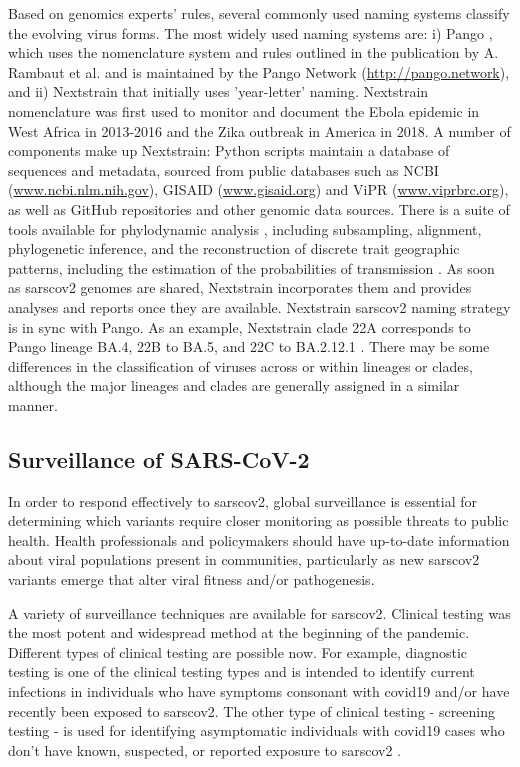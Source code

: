        Based on genomics experts' rules, several commonly used naming systems \cite{reich} classify the evolving virus forms. The most widely used naming systems are: i) Pango \cite{otoole2021}, which uses the nomenclature system and rules outlined in the publication by A. Rambaut et al. \cite{rambaut2020} and is maintained by the Pango Network (\url{http://pango.network}), and ii) Nextstrain that initially uses 'year-letter' naming. Nextstrain nomenclature was first used to monitor and document the Ebola epidemic in West Africa in 2013-2016 and the Zika outbreak in America in 2018. A number of components make up Nextstrain: Python scripts maintain a database of sequences and metadata, sourced from public databases such as NCBI (\url{www.ncbi.nlm.nih.gov}), GISAID (\url{www.gisaid.org}) and ViPR (\url{www.viprbrc.org}), as well as GitHub repositories and other genomic data sources. There is a suite of tools available for phylodynamic analysis \cite{volz2013}, including subsampling, alignment, phylogenetic inference, and the reconstruction of discrete trait geographic patterns, including the estimation of the probabilities of transmission \cite{hadfield2018}. As soon as \acrshort{sarscov2} genomes are shared, Nextstrain incorporates them and provides analyses and reports once they are available. Nextstrain \acrshort{sarscov2} naming strategy is in sync with Pango. As an example, Nextstrain clade 22A corresponds to Pango lineage BA.4, 22B to BA.5, and 22C to BA.2.12.1 \cite{nextstrain}. There may be some differences in the classification of viruses across or within lineages or clades, although the major lineages and clades are generally assigned in a similar manner.
    
    \subsection{Surveillance of SARS-CoV-2}
    
    In order to respond effectively to \acrshort{sarscov2}, global surveillance is essential for determining which variants require closer monitoring as possible threats to public health. Health professionals and policymakers should have up-to-date information about viral populations present in communities, particularly as new \acrshort{sarscov2} variants emerge that alter viral fitness and/or pathogenesis.
    
    A variety of surveillance techniques are available for \acrshort{sarscov2}. Clinical testing was the most potent and widespread method at the beginning of the pandemic. Different types of clinical testing are possible now. For example, diagnostic testing is one of the clinical testing types and is intended to identify current infections in individuals who have symptoms consonant with \acrshort{covid19} and/or have recently been exposed to \acrshort{sarscov2}. The other type of clinical testing - screening testing - is used for identifying asymptomatic individuals with \acrshort{covid19} cases who don't have known, suspected, or reported exposure to \acrshort{sarscov2} \cite{cdc2020c}.
    
